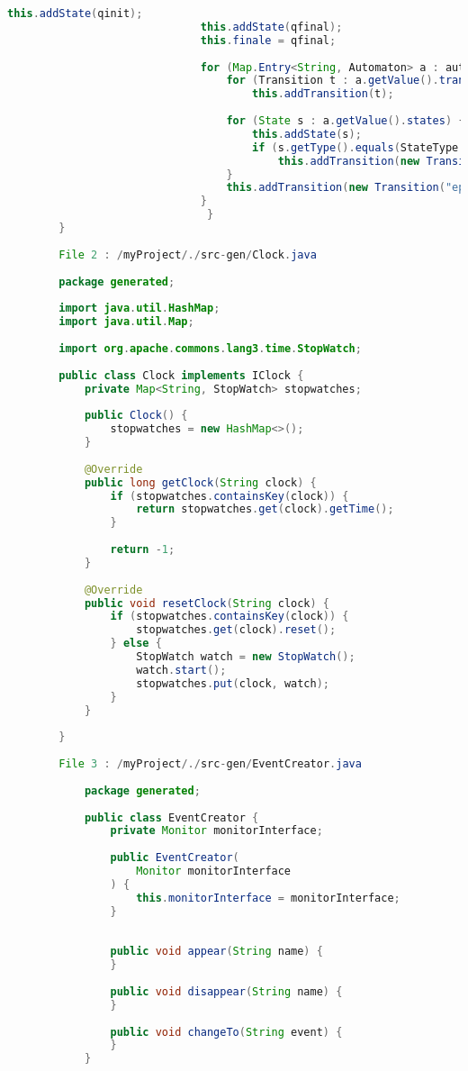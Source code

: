 \begin{lstlisting}[language=java, caption={példa unit teszteset.},captionpos=b]
							  this.addState(qinit);
							  this.addState(qfinal);
							  this.finale = qfinal;
					  
							  for (Map.Entry<String, Automaton> a : automatas.entrySet()) {
								  for (Transition t : a.getValue().transitions)
									  this.addTransition(t);
				   
								  for (State s : a.getValue().states) {
									  this.addState(s);
									  if (s.getType().equals(StateType.FINAL))
										  this.addTransition(new Transition("epsilon", s, qfinal));
								  }
								  this.addTransition(new Transition("epsilon; " + a.getKey(), qinit, a.getValue().initial));
							  }   
							   }
		}
		
		File 2 : /myProject/./src-gen/Clock.java
		
		package generated;
		
		import java.util.HashMap;
		import java.util.Map;
		
		import org.apache.commons.lang3.time.StopWatch;
		
		public class Clock implements IClock {
			private Map<String, StopWatch> stopwatches;
		
			public Clock() {
				stopwatches = new HashMap<>();
			}
			
			@Override
			public long getClock(String clock) {
				if (stopwatches.containsKey(clock)) {
					return stopwatches.get(clock).getTime();
				}
				
				return -1;
			}
		
			@Override
			public void resetClock(String clock) {
				if (stopwatches.containsKey(clock)) {
					stopwatches.get(clock).reset();
				} else {
					StopWatch watch = new StopWatch();
					watch.start();
					stopwatches.put(clock, watch);
				}
			}
		
		}
		
		File 3 : /myProject/./src-gen/EventCreator.java
		
			package generated;
		
			public class EventCreator {
				private Monitor monitorInterface;
				
				public EventCreator(
					Monitor monitorInterface
				) {
					this.monitorInterface = monitorInterface;
				}
				
				
				public void appear(String name) {
				}
				
				public void disappear(String name) {
				}
				
				public void changeTo(String event) {
				}
			}
		

\end{lstlisting}
